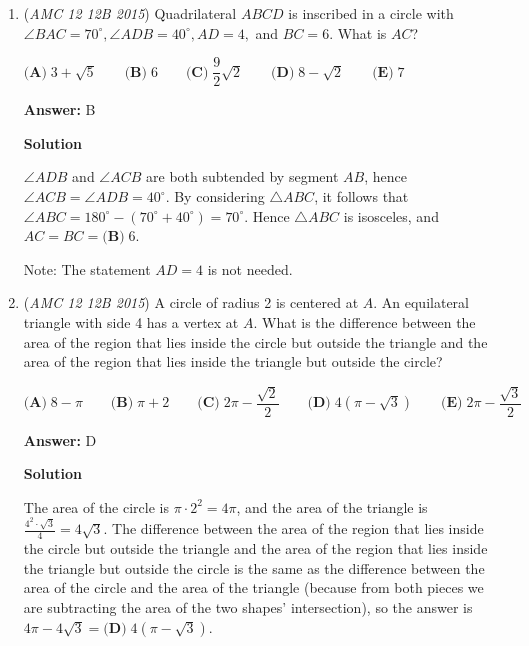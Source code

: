 \begin{enumerate}
 More on Vieta's Formulas: \href{https://artofproblemsolving.com/wiki/index.php/Vieta\%27s\_formulas}{https://artofproblemsolving.com/wiki/index.php/Vieta\%27s\_formulas}

 


	\item (\textit{AMC 12 12B 2015}) Quadrilateral $ABCD$ is inscribed in a circle with $\angle BAC=70^{\circ}, \angle ADB=40^{\circ}, AD=4,$ and $BC=6$. What is $AC$?


 $\textbf{(A)}\; 3+\sqrt{5} \qquad\textbf{(B)}\; 6 \qquad\textbf{(C)}\; \dfrac{9}{2}\sqrt{2} \qquad\textbf{(D)}\; 8-\sqrt{2} \qquad\textbf{(E)}\; 7$

 \textbf{Answer: }B



\textbf{Solution}

$\angle ADB$ and $\angle ACB$ are both subtended by segment $AB$, hence $\angle ACB = \angle ADB = 40^\circ$. By considering $\triangle ABC$, it follows that $\angle ABC = 180^\circ - (70^\circ + 40^\circ) = 70^\circ$. Hence $\triangle ABC$ is isosceles, and $AC = BC = \boxed{\textbf{(B)}\; 6}.$

 
Note: The statement $AD=4$ is not needed.

 


	\item (\textit{AMC 12 12B 2015}) A circle of radius 2 is centered at $A$. An equilateral triangle with side 4 has a vertex at $A$. What is the difference between the area of the region that lies inside the circle but outside the triangle and the area of the region that lies inside the triangle but outside the circle?


 $\textbf{(A)}\; 8-\pi \qquad\textbf{(B)}\; \pi+2 \qquad\textbf{(C)}\; 2\pi-\dfrac{\sqrt{2}}{2} \qquad\textbf{(D)}\; 4(\pi-\sqrt{3}) \qquad\textbf{(E)}\; 2\pi-\dfrac{\sqrt{3}}{2}$

 \textbf{Answer: }D



\textbf{Solution}

The area of the circle is $\pi \cdot 2^2 = 4\pi$, and the area of the triangle is $\frac{4^2 \cdot\sqrt{3}}{4} = 4\sqrt{3}$. The difference between the area of the region that lies inside the circle but outside the triangle and the area of the region that lies inside the triangle but outside the circle is the same as the difference between the area of the circle and the area of the triangle (because from both pieces we are subtracting the area of the two shapes' intersection), so the answer is $4\pi-4\sqrt{3}  = \boxed{\textbf{(D)}\;  4(\pi-\sqrt{3})}$.


\end{enumerate}
